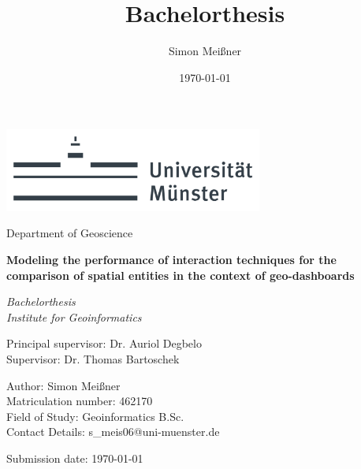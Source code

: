 \documentclass[fontsize=12pt,parskip=half,listof=totoc]{scrreprt}
\title{Bachelorthesis}
\author{Simon Meißner}
\date{\today}
\begin{document}
\begin{titlepage}
    \sffamily
    \begin{center}
        \includegraphics[width=8.5cm]{images/UniMuenster.png}
        \vspace{.5cm}
        
        {\large Department of Geoscience}
        \vspace{2cm}
        
        \begin{spacing}{1.5}
            {\Large \textbf{Modeling the performance of interaction techniques for
                            the comparison of spatial entities in the context of
                            geo-dashboards}}
            \vspace{.5cm}

            {\large \textit{Bachelorthesis\\Institute for Geoinformatics}}
        \end{spacing}
    \end{center}
    \vfill

    Principal supervisor:       \tabto{5cm} Dr. Auriol Degbelo\\
    Supervisor:      \tabto{5cm} Dr. Thomas Bartoschek

    Author:         \tabto{5cm} Simon Meißner\\
    Matriculation number:   \tabto{5cm} 462170\\
    Field of Study: \tabto{5cm} Geoinformatics B.Sc.\\
    Contact Details: \tabto{5cm} s\_meis06@uni-muenster.de


    Submission date:        \tabto{5cm} \today
\end{titlepage}


\tableofcontents
\clearpage

\pagestyle{headings}












\end{document}
